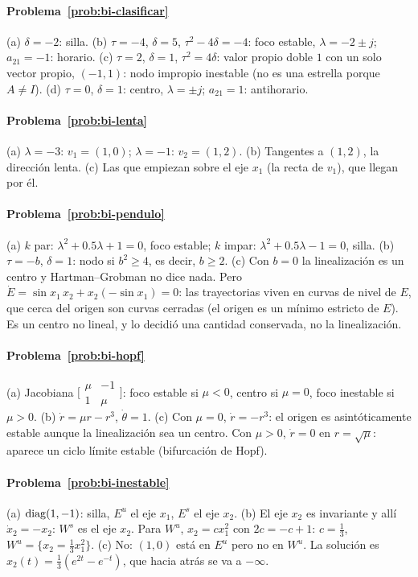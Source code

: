 \paragraph{Problema~\ref{prob:bi-clasificar}}
(a) $\delta=-2$: silla. (b) $\tau=-4$, $\delta=5$, $\tau^2-4\delta=-4$: foco estable, $\lambda=-2\pm j$; $a_{21}=-1$: horario. (c) $\tau=2$, $\delta=1$, $\tau^2=4\delta$: valor propio doble $1$ con un solo vector propio, $(-1,1)$: nodo impropio inestable (no es una estrella porque $A\neq I$). (d) $\tau=0$, $\delta=1$: centro, $\lambda=\pm j$; $a_{21}=1$: antihorario.

\paragraph{Problema~\ref{prob:bi-lenta}}
(a) $\lambda=-3$: $v_1=(1,0)$; $\lambda=-1$: $v_2=(1,2)$. (b) Tangentes a $(1,2)$, la dirección lenta. (c) Las que empiezan sobre el eje $x_1$ (la recta de $v_1$), que llegan por él.

\paragraph{Problema~\ref{prob:bi-pendulo}}
(a) $k$ par: $\lambda^2+0.5\lambda+1=0$, foco estable; $k$ impar: $\lambda^2+0.5\lambda-1=0$, silla. (b) $\tau=-b$, $\delta=1$: nodo si $b^2\ge4$, es decir, $b\ge2$. (c) Con $b=0$ la linealización es un centro y Hartman--Grobman no dice nada. Pero $\dot E=\sin x_1\,x_2+x_2(-\sin x_1)=0$: las trayectorias viven en curvas de nivel de $E$, que cerca del origen son curvas cerradas (el origen es un mínimo estricto de $E$). Es un centro no lineal, y lo decidió una cantidad conservada, no la linealización.

\paragraph{Problema~\ref{prob:bi-hopf}}
(a) Jacobiana $\bigl[\begin{smallmatrix}\mu&-1\\1&\mu\end{smallmatrix}\bigr]$: foco estable si $\mu<0$, centro si $\mu=0$, foco inestable si $\mu>0$. (b) $\dot r=\mu r-r^3$, $\dot\theta=1$. (c) Con $\mu=0$, $\dot r=-r^3$: el origen es asintóticamente estable aunque la linealización sea un centro. Con $\mu>0$, $\dot r=0$ en $r=\sqrt\mu$: aparece un ciclo límite estable (bifurcación de Hopf).

\paragraph{Problema~\ref{prob:bi-inestable}}
(a) $\operatorname{diag}(1,-1)$: silla, $E^u$ el eje $x_1$, $E^s$ el eje $x_2$. (b) El eje $x_2$ es invariante y allí $\dot x_2=-x_2$: $W^s$ es el eje $x_2$. Para $W^u$, $x_2=cx_1^2$ con $2c=-c+1$: $c=\tfrac13$, $W^u=\{x_2=\tfrac13x_1^2\}$. (c) No: $(1,0)$ está en $E^u$ pero no en $W^u$. La solución es $x_2(t)=\tfrac13(e^{2t}-e^{-t})$, que hacia atrás se va a $-\infty$.


